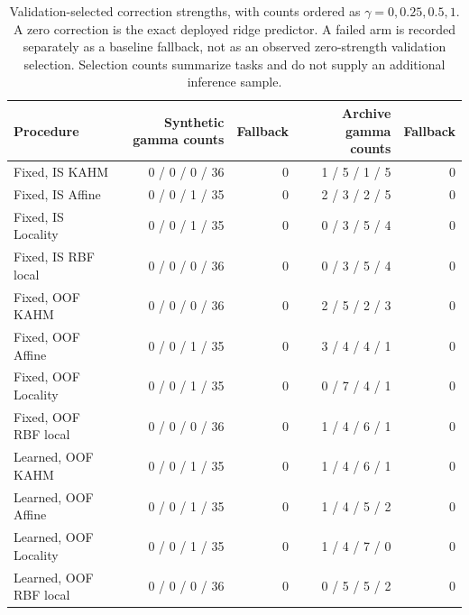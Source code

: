 \begin{table}[!htbp]
\centering\scriptsize\setlength{\tabcolsep}{4pt}
\caption{Validation-selected correction strengths, with counts ordered as $\gamma=0,0.25,0.5,1$. A zero correction is the exact deployed ridge predictor. A failed arm is recorded separately as a baseline fallback, not as an observed zero-strength validation selection. Selection counts summarize tasks and do not supply an additional inference sample.}
\label{tab:target-selection}
\begin{tabular}{lrrrr}
\toprule
Procedure & Synthetic gamma counts & Fallback & Archive gamma counts & Fallback \\
\midrule
Fixed, IS KAHM & 0 / 0 / 0 / 36 & 0 & 1 / 5 / 1 / 5 & 0 \\
Fixed, IS Affine & 0 / 0 / 1 / 35 & 0 & 2 / 3 / 2 / 5 & 0 \\
Fixed, IS Locality & 0 / 0 / 1 / 35 & 0 & 0 / 3 / 5 / 4 & 0 \\
Fixed, IS RBF local & 0 / 0 / 0 / 36 & 0 & 0 / 3 / 5 / 4 & 0 \\
Fixed, OOF KAHM & 0 / 0 / 0 / 36 & 0 & 2 / 5 / 2 / 3 & 0 \\
Fixed, OOF Affine & 0 / 0 / 1 / 35 & 0 & 3 / 4 / 4 / 1 & 0 \\
Fixed, OOF Locality & 0 / 0 / 1 / 35 & 0 & 0 / 7 / 4 / 1 & 0 \\
Fixed, OOF RBF local & 0 / 0 / 0 / 36 & 0 & 1 / 4 / 6 / 1 & 0 \\
Learned, OOF KAHM & 0 / 0 / 1 / 35 & 0 & 1 / 4 / 6 / 1 & 0 \\
Learned, OOF Affine & 0 / 0 / 1 / 35 & 0 & 1 / 4 / 5 / 2 & 0 \\
Learned, OOF Locality & 0 / 0 / 1 / 35 & 0 & 1 / 4 / 7 / 0 & 0 \\
Learned, OOF RBF local & 0 / 0 / 0 / 36 & 0 & 0 / 5 / 5 / 2 & 0 \\
\bottomrule
\end{tabular}
\end{table}
